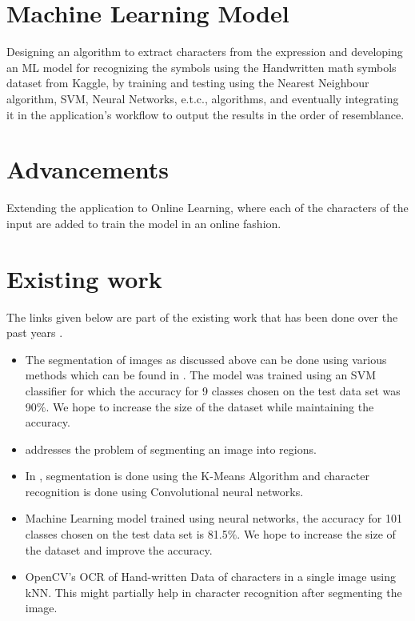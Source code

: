 \documentclass[11pt]{article}
\begin{document}
\section*{Machine Learning Model}
Designing an algorithm to extract characters from the expression and developing an ML model for recognizing the symbols using the Handwritten math symbols dataset\cite{kaggle} from Kaggle\cite{kaggle}, by training and testing using the  Nearest Neighbour algorithm\cite{Opencv}, SVM\cite{SVM}, Neural Networks, e.t.c., algorithms, and eventually integrating it in the application's workflow to output the results in the order of resemblance.

\section*{Advancements}
Extending the application to Online Learning\cite{online}, where each of the characters of the input are added to train the model in an online fashion.

\section*{Existing work}
The links given below are part of the existing work that has been done over the past years .\\
\begin{itemize}
\item The segmentation of images as discussed above can be done using various methods which can be found in \cite{SVM}. The model was trained using an SVM classifier for which the accuracy for 9 classes chosen on the test data set was 90$\%$. We hope to increase the size of the dataset while maintaining the accuracy.
\item \cite{graph} addresses the problem of segmenting an image into regions.
\item In \cite{chang}, segmentation is done using the K-Means Algorithm and character recognition is done using Convolutional neural networks.
\item Machine Learning model trained using neural networks, the accuracy for 101 classes chosen on the test data set is  81.5$\%$. We hope to increase the size of the dataset and improve the accuracy. \cite{offline}
\item OpenCV's OCR of Hand-written Data of characters in a single image using kNN.\cite{Opencv} This might partially help in character recognition after segmenting the image.
\end{itemize}
\end{document}

